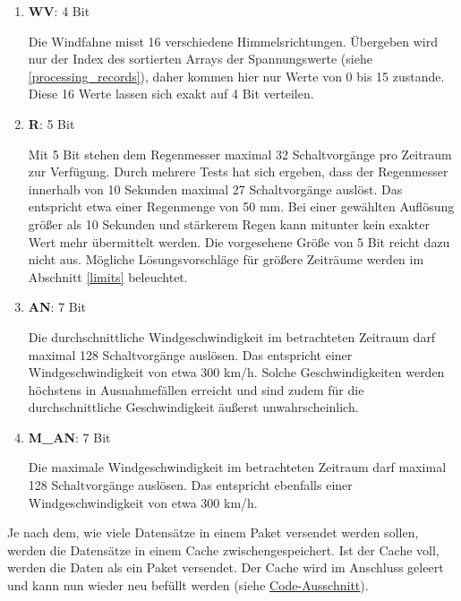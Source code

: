 \documentclass[12pt]{article}
\begin{document}
      \begin{enumerate}
        \item \textbf{WV}: 4 Bit
        
        Die Windfahne misst 16 verschiedene Himmelsrichtungen.
        Übergeben wird nur der Index des sortierten Arrays der Spannungswerte (siehe \underline{\ref{processing_records}}), daher kommen hier nur Werte von 0 bis 15 zustande.
        Diese 16 Werte lassen sich exakt auf 4 Bit verteilen.

        \item \textbf{R}: 5 Bit
        
        Mit 5 Bit stehen dem Regenmesser maximal 32 Schaltvorgänge pro Zeitraum zur Verfügung.
        Durch mehrere Tests hat sich ergeben, dass der Regenmesser innerhalb von 10 Sekunden maximal 27 Schaltvorgänge auslöst.
        Das entspricht etwa einer Regenmenge von 50 mm.
        Bei einer gewählten Auflösung größer als 10 Sekunden und stärkerem Regen kann mitunter kein exakter Wert mehr übermittelt werden.
        Die vorgesehene Größe von 5 Bit reicht dazu nicht aus.
        Mögliche Lösungsvorschläge für größere Zeiträume werden im Abschnitt \ref{limits} beleuchtet. %

        \item \textbf{AN}: 7 Bit %
        
        Die durchschnittliche Windgeschwindigkeit im betrachteten Zeitraum darf maximal 128 Schaltvorgänge auslösen.
        Das entspricht einer Windgeschwindigkeit von etwa 300 km/h.
        Solche Geschwindigkeiten werden höchstens in Ausnahmefällen erreicht und sind zudem für die durchschnittliche Geschwindigkeit äußerst unwahrscheinlich.

        \item \textbf{M\_AN}: 7 Bit %
        
        Die maximale Windgeschwindigkeit im betrachteten Zeitraum darf maximal 128 Schaltvorgänge auslösen.
        Das entspricht ebenfalls einer Windgeschwindigkeit von etwa 300 km/h.
      \end{enumerate}

      Je nach dem, wie viele Datensätze in einem Paket versendet werden sollen, werden die Datensätze in einem Cache zwischengespeichert.
      Ist der Cache voll, werden die Daten als ein Paket versendet.
      Der Cache wird im Anschluss geleert und kann nun wieder neu befüllt werden (siehe \href{https://github.com/HTWDD-RN/ps21-LoRa/blob/9c012bc1d41e960b6edf9e756e8948e387f28c83/src/lora_weather_station/lora_weather_station.ino#L154}{Code-Ausschnitt}).
\end{document}
